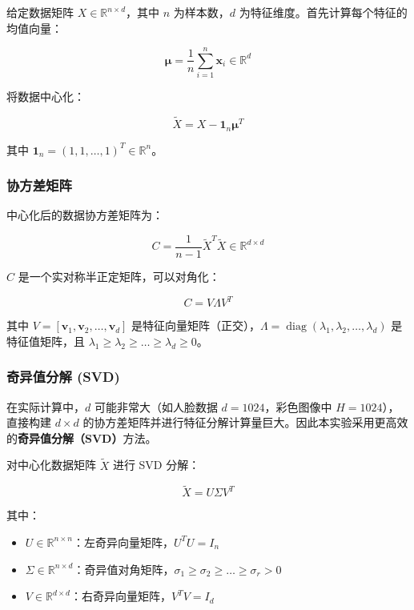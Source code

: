 \documentclass[a4paper]{article}
\begin{document}
给定数据矩阵 $X \in \mathbb{R}^{n \times d}$，其中 $n$ 为样本数，$d$ 为特征维度。首先计算每个特征的均值向量：

\begin{equation}
\boldsymbol{\mu} = \frac{1}{n} \sum_{i=1}^{n} \mathbf{x}_i \in \mathbb{R}^{d}
\end{equation}

将数据中心化：

\begin{equation}
\tilde{X} = X - \mathbf{1}_n \boldsymbol{\mu}^T
\end{equation}

其中 $\mathbf{1}_n = (1, 1, \dots, 1)^T \in \mathbb{R}^{n}$。

\subsubsection{协方差矩阵}

中心化后的数据协方差矩阵为：

\begin{equation}
C = \frac{1}{n-1} \tilde{X}^T \tilde{X} \in \mathbb{R}^{d \times d}
\end{equation}

$C$ 是一个实对称半正定矩阵，可以对角化：

\begin{equation}
C = V \Lambda V^T
\end{equation}

其中 $V = [\mathbf{v}_1, \mathbf{v}_2, \dots, \mathbf{v}_d]$ 是特征向量矩阵（正交），$\Lambda = \operatorname{diag}(\lambda_1, \lambda_2, \dots, \lambda_d)$ 是特征值矩阵，且 $\lambda_1 \geq \lambda_2 \geq \dots \geq \lambda_d \geq 0$。

\subsubsection{奇异值分解 (SVD)}

在实际计算中，$d$ 可能非常大（如人脸数据 $d = 1024$，彩色图像中 $H = 1024$），直接构建 $d \times d$ 的协方差矩阵并进行特征分解计算量巨大。因此本实验采用更高效的\textbf{奇异值分解（SVD）}方法。

对中心化数据矩阵 $\tilde{X}$ 进行 SVD 分解：

\begin{equation}
\tilde{X} = U \Sigma V^T
\end{equation}

其中：
\begin{itemize}
    \item $U \in \mathbb{R}^{n \times n}$：左奇异向量矩阵，$U^T U = I_n$
    \item $\Sigma \in \mathbb{R}^{n \times d}$：奇异值对角矩阵，$\sigma_1 \geq \sigma_2 \geq \dots \geq \sigma_r > 0$
    \item $V \in \mathbb{R}^{d \times d}$：右奇异向量矩阵，$V^T V = I_d$
\end{itemize}
\end{document}
